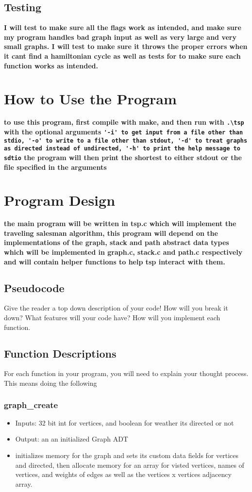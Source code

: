\documentclass{article}
\begin{document}
\subsection*{Testing}

\textbf{I will test to make sure all the flags work as intended, and make sure my program handles bad graph input as well as very large and very small graphs. I will test to make sure it throws the proper errors when it cant find a hamiltonian cycle as well as tests for to make sure each function works as intended.}

\section*{How to Use the Program}

\textbf{to use this program, first compile with make, and then run with \lstinline{.\tsp} with the optional arguments \lstinline{'-i' to get input from a file other than stdio, '-o' to write to a file other than stdout, '-d' to treat graphs as directed instead of undirected, '-h' to print the help message to sdtio} the program will then print the shortest to either stdout or the file specified in the arguments}

\section*{Program Design}

\textbf{the main program will be written in tsp.c which will implement the traveling salesman algorithm, this program will depend on the implementations of the graph, stack and path abstract data types which will be implemented in graph.c, stack.c and path.c respectively and will contain helper functions to help tsp interact with them.}

\subsection*{Pseudocode}
Give the reader a top down description of your code! How will you break it down? What features will your code have? 
How will you implement each function. 

\subsection*{Function Descriptions}
For each function in your program, you will need to explain your thought process. This means doing the following
\subsubsection{graph\_create}
\begin{itemize}
    \item Inputs: 32 bit int for vertices, and boolean for weather its directed or not 
    \item Output: an an initialized Graph ADT
    \item initializes memory for the graph and sets its custom data fields for vertices and directed, then allocate memory for an array for visted vertices, names of vertices, and weights of edges as well as the vertices x vertices adjacency array.
\end{itemize}
\end{document}
